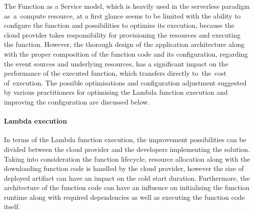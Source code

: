 The Function as a Service model, which is heavily used in the serverless paradigm as~a~compute resource, at a first glance seems to be limited with the ability to configure the function and possibilities to optimise its execution, because the cloud provider takes responsibility for provisioning the resources and executing the function.
However, the thorough design of the application architecture along with the proper composition of the function code and its configuration, regarding the event sources and underlying resources, has a significant impact on the performance of the executed function, which transfers directly to~the~cost of~execution.
The possible optimisations and configuration adjustment suggested by various practitioners for optimising the Lambda function execution and improving the configuration are discussed below.

\paragraph{Lambda execution}

In terms of the Lambda function execution, the improvement possibilities can be divided between the cloud provider and the developers implementing the solution. Taking into consideration the function lifecycle, resource allocation along with the downloading function code is handled by the cloud provider, however the size of deployed artifact can have an impact on the cold start duration. Furthermore, the architecture of the function code can have an influence on initialising the function runtime along with required dependencies as well as executing the function code itself.

